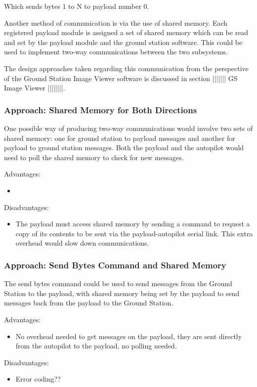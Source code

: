 Which sends bytes 1 to N to payload number 0.

Another method of communication is via the use of shared memory. Each registered payload module is assigned a set of shared memory which can be read and set by the payload module and the ground station software. This could be used to implement two-way communications between the two subsystems.

The design approaches taken regarding this communication from the perspective of the Ground Station Image Viewer software is discussed in section ||||||| GS Image Viewer ||||||||.

\subsubsection{Approach: Shared Memory for Both Directions}
One possible way of producing two-way communications would involve two sets of shared memory: one for ground station to payload messages and another for payload to ground station messages. Both the payload and the autopilot would need to poll the shared memory to check for new messages.

Advantages:
\begin{itemize}
\item 
\end{itemize}

Disadvantages:
\begin{itemize}
\item The payload must access shared memory by sending a command to request a copy of its contents to be sent via the payload-autopilot serial link. This extra overhead would slow down communications.
\end{itemize}


\subsubsection{Approach: Send Bytes Command and Shared Memory}
The send bytes command could be used to send messages from the Ground Station to the payload, with shared memory being set by the payload to send messages back from the payload to the Ground Station.

Advantages:
\begin{itemize}
\item No overhead needed to get messages on the payload, they are sent directly from the autopilot to the payload, no polling needed.
\end{itemize}

Disadvantages:
\begin{itemize}
\item Error coding??
\end{itemize}
